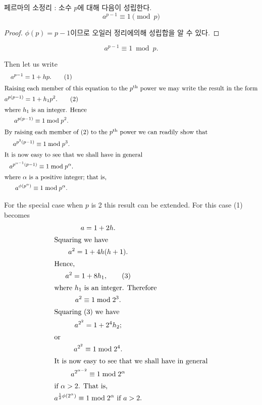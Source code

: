 \begin{corollary}
    페르마의 소정리 :  소수 $p$에 대해 다음이 성립한다.
    $$ a^{p-1} \equiv 1 \pmod{p}$$
\end{corollary}

\begin{proof}
    $\phi(p)  = p-1 $이므로 오일러 정리에의해 성립합을 알 수 있다.
\end{proof}


\begin{equation*}
    a^{p-1} \equiv 1 \bmod p.
\end{equation*}

Then let us write
\begin{gather}
a^{p-1} = 1 + hp. \tag{1} \\
\intertext{Raising each member of this equation to the
$p^{\text{th}}$ power we may write the result in the form}
a^{p(p-1)} = 1 + h_1p^2. \tag{2} \\
\intertext{where $h_1$ is an integer. Hence}
a^{p(p-1)} \equiv 1 \bmod p^2. \notag \\
\intertext{By raising each member of (2) to the $p^{\text{th}}$
power we can readily show that}
a^{p^2(p-1)} \equiv 1 \bmod p^3. \notag \\
\intertext{It is now easy to see that we shall have in general}
a^{p^{\alpha - 1}(p-1)} \equiv 1 \bmod p^{\alpha}. \notag \\
\intertext{where $\alpha$ is a positive integer; that is,}
a^{\phi(p^{\alpha})} \equiv 1 \bmod p^{\alpha}. \notag
\end{gather}


    
For the special case when $p$ is 2 this result can be extended. For
this case (1) becomes
\begin{gather}
a = 1 + 2h. \notag \\
\intertext{Squaring we have}
a^2 = 1 + 4h(h+1). \notag \\
\intertext{Hence,}
a^2 = 1+8h_1, \tag{3} \\
\intertext{where $h_1$ is an integer. Therefore}
a^2 \equiv 1 \bmod 2^3. \notag \\
\intertext{Squaring (3) we have}
a^{2^2} = 1 + 2^4h_2; \notag \\
\intertext{or}
a^{2^2} \equiv 1 \bmod 2^4. \notag \\
\intertext{It is now easy to see that we shall have in general}
a^{2^{\alpha-2}} \equiv 1 \bmod 2^{\alpha} \notag \\
\intertext{if $\alpha > 2$. That is,}
a^{\frac{1}{2}\phi(2^{\alpha})} \equiv 1 \bmod 2^{\alpha}
  \text{ if } a > 2.
\end{gather}

